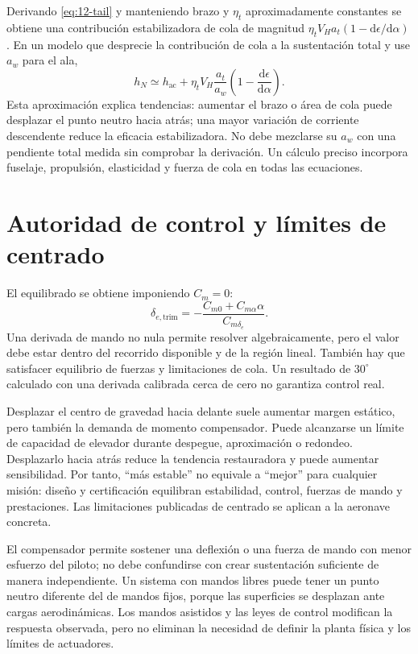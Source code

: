 Derivando \eqref{eq:12-tail} y manteniendo brazo y $\eta_t$ aproximadamente constantes se obtiene una contribución estabilizadora de cola de magnitud $\eta_tV_Ha_t(1-\mathrm d\epsilon/\mathrm d\alpha)$. En un modelo que desprecie la contribución de cola a la sustentación total y use $a_w$ para el ala,
\begin{equation}
h_N\simeq h_{\mathrm{ac}}+
\eta_tV_H\frac{a_t}{a_w}\left(1-\frac{\mathrm d\epsilon}{\mathrm d\alpha}\right).
\end{equation}
Esta aproximación explica tendencias: aumentar el brazo o área de cola puede desplazar el punto neutro hacia atrás; una mayor variación de corriente descendente reduce la eficacia estabilizadora. No debe mezclarse su $a_w$ con una pendiente total medida sin comprobar la derivación. Un cálculo preciso incorpora fuselaje, propulsión, elasticidad y fuerza de cola en todas las ecuaciones.

\section{Autoridad de control y límites de centrado}
El equilibrado se obtiene imponiendo $C_m=0$:
\begin{equation}\label{eq:12-trim}
\delta_{e,\mathrm{trim}}=-\frac{C_{m0}+C_{m\alpha}\alpha}{C_{m\delta_e}}.
\end{equation}
Una derivada de mando no nula permite resolver algebraicamente, pero el valor debe estar dentro del recorrido disponible y de la región lineal. También hay que satisfacer equilibrio de fuerzas y limitaciones de cola. Un resultado de $30^\circ$ calculado con una derivada calibrada cerca de cero no garantiza control real.

Desplazar el centro de gravedad hacia delante suele aumentar margen estático, pero también la demanda de momento compensador. Puede alcanzarse un límite de capacidad de elevador durante despegue, aproximación o redondeo. Desplazarlo hacia atrás reduce la tendencia restauradora y puede aumentar sensibilidad. Por tanto, ``más estable'' no equivale a ``mejor'' para cualquier misión: diseño y certificación equilibran estabilidad, control, fuerzas de mando y prestaciones. Las limitaciones publicadas de centrado se aplican a la aeronave concreta.

El compensador permite sostener una deflexión o una fuerza de mando con menor esfuerzo del piloto; no debe confundirse con crear sustentación suficiente de manera independiente. Un sistema con mandos libres puede tener un punto neutro diferente del de mandos fijos, porque las superficies se desplazan ante cargas aerodinámicas. Los mandos asistidos y las leyes de control modifican la respuesta observada, pero no eliminan la necesidad de definir la planta física y los límites de actuadores.

